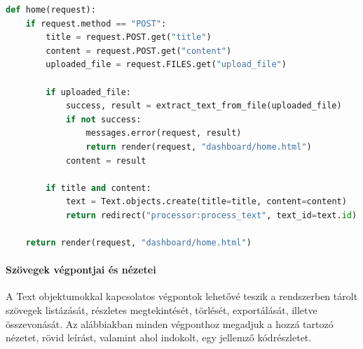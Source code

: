 \begin{lstlisting}[language={Python}]
def home(request):
    if request.method == "POST":
        title = request.POST.get("title")
        content = request.POST.get("content")
        uploaded_file = request.FILES.get("upload_file")

        if uploaded_file:
            success, result = extract_text_from_file(uploaded_file)
            if not success:
                messages.error(request, result)
                return render(request, "dashboard/home.html")
            content = result

        if title and content:
            text = Text.objects.create(title=title, content=content)
            return redirect("processor:process_text", text_id=text.id)

    return render(request, "dashboard/home.html")
\end{lstlisting}

\paragraph{Szövegek végpontjai és nézetei}

A Text objektumokkal kapcsolatos végpontok lehetővé teszik a rendszerben tárolt szövegek listázását, részletes megtekintését, törlését, exportálását, illetve összevonását. Az alábbiakban minden végponthoz megadjuk a hozzá tartozó nézetet, rövid leírást, valamint ahol indokolt, egy jellemző kódrészletet.

